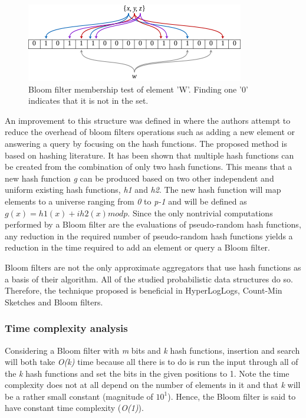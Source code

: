 \begin{figure}[!htb]
    \begin{center}
      \includegraphics[scale=0.8]{figures/bloom-filter.png}
      \caption[Bloom filter membership test]{Bloom filter membership test of element 'W'. Finding one '0' indicates that it is not in the set.}
      \label{fig:bloom-filter}
    \end{center}
\end{figure}


An improvement to this structure was defined in \cite{Kirsch-Better-Bloom} where the authors attempt to reduce the overhead of bloom filters operations such as adding a new element or answering a query by focusing on the hash functions. The proposed method is based on hashing literature. It has been shown that multiple hash functions can be created from the combination of only two hash functions. This means that a new hash function \textit{g} can be produced based on  two other independent and uniform existing hash functions, \textit{h1} and \textit{h2}. The new hash function will map elements to a universe ranging from \textit{0} to \textit{p-1} and will be defined as \textit{$g(x) = h1(x) + ih2(x) mod p$}. Since the only nontrivial computations performed by a Bloom filter are the evaluations of pseudo-random hash functions, any reduction in the required number of pseudo-random hash functions yields a reduction in the time required to add an element or query a Bloom filter.

Bloom filters are not the only approximate aggregators that use hash functions as a basis of their algorithm. All of the studied probabilistic data structures do so. Therefore, the technique proposed is beneficial in HyperLogLogs, Count-Min Sketches and Bloom filters.

\subsubsection{Time complexity analysis}
Considering a Bloom filter with \textit{m} bits and \textit{k} hash functions, insertion and search will both take \textit{O(k)} time because all there is to do is run the input through all of the \textit{k} hash functions and set the bits in the given positions to 1. Note the time complexity does not at all depend on the number of elements in it and that \textit{k} will be a rather small constant (magnitude of $10^1$). Hence, the Bloom filter is said to have constant time complexity (\textit{O(1)}).

